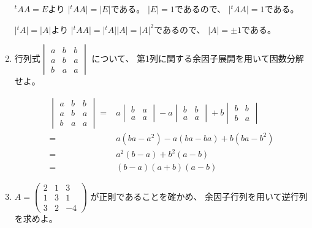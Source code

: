 \documentclass[10pt,b5paper]{ltjsarticle}
\begin{document}
\begin{enumerate}
       \dotfill

       ${}^{t}A A =E$より
       $\lvert {}^{t}A A \rvert = \lvert E \rvert$である。
       $\lvert E \rvert =1$であるので、
       $\lvert {}^{t}A A \rvert = 1$である。

       $\lvert {}^{t}A\rvert = \lvert A \rvert$より
       $\lvert {}^{t}A A \rvert = \lvert {}^{t}A\rvert \lvert A \rvert
       =\lvert A \rvert ^2$であるので、
       $\lvert A \rvert = \pm 1$である。

       \hrulefill
 \item 行列式$\begin{vmatrix} a & b & b\\a & b & a\\b & a & a\end{vmatrix}$
       について、
       第1列に関する余因子展開を用いて因数分解せよ。

       \dotfill

       \begin{align}
        \begin{vmatrix} a & b & b\\a & b & a\\b & a & a\end{vmatrix}
        =&
          a\begin{vmatrix} b & a\\ a & a\end{vmatrix}
        - a\begin{vmatrix} b & b\\ a & a\end{vmatrix}
        + b\begin{vmatrix} b & b\\ b & a\end{vmatrix}\\
        =& a(ba-a^2)-a(ba-ba)+b(ba-b^2)\\
        =& a^2(b-a)+b^2(a-b)\\ 
        =& (b-a)(a+b)(a-b)
       \end{align}
       \hrulefill
 \item $A=\begin{pmatrix} 2 & 1 & 3\\ 1 & 3 & 1\\ 3 & 2 & -4\end{pmatrix}$
       が正則であることを確かめ、
       余因子行列を用いて逆行列を求めよ。

       \dotfill


\end{enumerate}
\end{document}
